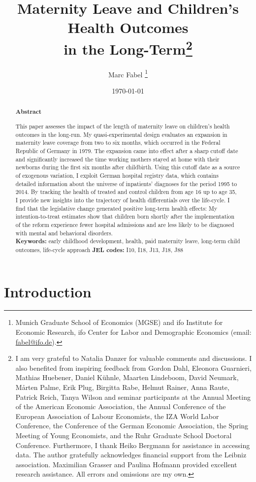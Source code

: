 \documentclass[11pt, a4paper, draft]{article} %
\title{Maternity Leave and Children's Health Outcomes\\ in the Long-Term\footnote{I am very grateful to Natalia Danzer for valuable comments and discussions. I also benefited from inspiring feedback from Gordon Dahl, Eleonora Guarnieri, Mathias Huebener, Daniel Kühnle, Maarten Lindeboom, David Neumark, Mårten Palme, Erik Plug, Birgitta Rabe, Helmut Rainer, Anna Raute, Patrick Reich, Tanya Wilson and seminar participants at the Annual Meeting of the American Economic Association, the Annual Conference of the European Association of Labour Economists, the IZA World Labor Conference, the Conference of the German Economic Association, the Spring Meeting of Young Economists, and the Ruhr Graduate School Doctoral Conference. Furthermore, I thank Heiko Bergmann for assistance in accessing data. The author gratefully acknowledges financial support from the Leibniz association. Maximilian Grasser and Paulina Hofmann provided excellent research assistance. All errors and omissions are my own.
}}
\author{
	Marc Fabel 
		\thanks{Munich Graduate School of Economics (MGSE) and ifo Institute for Economic Research, ifo Center for Labor and Demographic Economics (email: \href{mailto:fabel@ifo.de}{fabel@ifo.de}).
		}
}
\date{\monthyeardate\today}
\begin{document}
\setcounter{page}{0}    
\maketitle

\renewcommand{\abstractname}{\vspace{-\baselineskip}} %

  \begin{abstract}\noindent 
   \footnotesize{\begin{center}\textbf{Abstract}\end{center} This paper assesses the impact of the length of maternity leave on children’s health outcomes in the long-run. My quasi-experimental design evaluates an expansion in maternity leave coverage from two to six months, which occurred in the Federal Republic of Germany in 1979. The expansion came into effect after a sharp cutoff date and significantly increased the time working mothers stayed at home with their newborns during the first six months after childbirth. Using this cutoff date as a source of exogenous variation, I exploit German hospital registry data, which contains detailed information about the universe of inpatients' diagnoses for the period 1995 to 2014. 
   By tracking the health of treated and control children from age 16 up to age 35, I provide new insights into the trajectory of health differentials over the life-cycle. I find that the legislative change generated positive long-term health effects: My intention-to-treat estimates show that children born shortly after the implementation of the reform experience fewer hospital admissions and are less likely to be diagnosed with mental and behavioral disorders.
   	\\\newline \textbf{Keywords:} early childhood development, health, paid maternity leave, long-term child outcomes, life-cycle approach \newline \textbf{JEL codes:} I10, I18, J13, J18, J88}
    \end{abstract}

\newpage


\section{Introduction}\label{sec:introduction}
\end{document}
